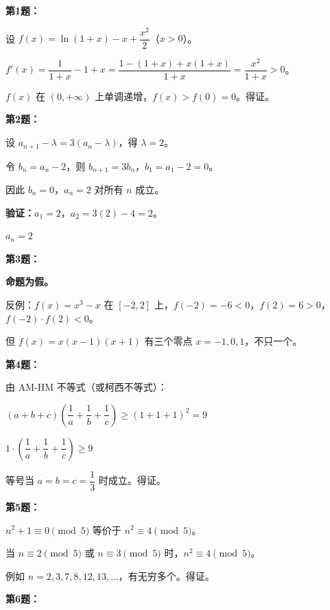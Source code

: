 \documentclass[12pt, a4paper]{ctexart}
\begin{document}
\vspace{20pt}

\begin{knowledgebox}[参考答案]

\textbf{第1题：}

设 $f(x) = \ln(1+x) - x + \dfrac{x^2}{2}$（$x > 0$）。

$f'(x) = \dfrac{1}{1+x} - 1 + x = \dfrac{1 - (1+x) + x(1+x)}{1+x} = \dfrac{x^2}{1+x} > 0$。

$f(x)$ 在 $(0, +\infty)$ 上单调递增，$f(x) > f(0) = 0$。得证。

\bigskip

\textbf{第2题：}

设 $a_{n+1} - \lambda = 3(a_n - \lambda)$，得 $\lambda = 2$。

令 $b_n = a_n - 2$，则 $b_{n+1} = 3b_n$，$b_1 = a_1 - 2 = 0$。

因此 $b_n = 0$，$a_n = 2$ 对所有 $n$ 成立。

\textbf{验证：}$a_1 = 2$，$a_2 = 3(2) - 4 = 2$。\checkmark

$\boxed{a_n = 2}$

\bigskip

\textbf{第3题：}

\textbf{命题为假。}

反例：$f(x) = x^3 - x$ 在 $[-2, 2]$ 上，$f(-2) = -6 < 0$，$f(2) = 6 > 0$，$f(-2) \cdot f(2) < 0$。

但 $f(x) = x(x-1)(x+1)$ 有三个零点 $x = -1, 0, 1$，不只一个。

\bigskip

\textbf{第4题：}

由 AM-HM 不等式（或柯西不等式）：

$(a+b+c)\left(\dfrac{1}{a} + \dfrac{1}{b} + \dfrac{1}{c}\right) \geq (1+1+1)^2 = 9$

$1 \cdot \left(\dfrac{1}{a} + \dfrac{1}{b} + \dfrac{1}{c}\right) \geq 9$

等号当 $a = b = c = \dfrac{1}{3}$ 时成立。得证。

\bigskip

\textbf{第5题：}

$n^2 + 1 \equiv 0 \pmod{5}$ 等价于 $n^2 \equiv 4 \pmod{5}$。

当 $n \equiv 2 \pmod{5}$ 或 $n \equiv 3 \pmod{5}$ 时，$n^2 \equiv 4 \pmod{5}$。

例如 $n = 2, 3, 7, 8, 12, 13, \ldots$，有无穷多个。得证。

\bigskip

\textbf{第6题：}


\end{knowledgebox}
\end{document}
